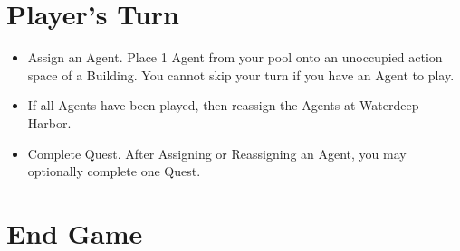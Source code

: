 \documentclass[12pt]{article}
\newenvironment{itemizeCustom}
{\begin{itemize}
  \setlength{\itemsep}{1pt}
  \setlength{\parskip}{0pt}
  \setlength{\parsep}{0pt}}
{\end{itemize}}
\begin{document}
\begin{mdframed}[style = customFrame]
\begin{multicols*}{2}
\section*{Player's Turn}
\begin{itemizeCustom}
	\item Assign an Agent. Place 1 Agent from your pool onto an unoccupied action space of a Building. You cannot skip your turn if you have an Agent to play.
	\item If all Agents have been played, then reassign the Agents at Waterdeep Harbor.
	\item Complete Quest. After Assigning or Reassigning an Agent, you may optionally complete one Quest.
\end{itemizeCustom}

\section*{End Game}

\end{multicols*}
\end{mdframed}
\end{document}
